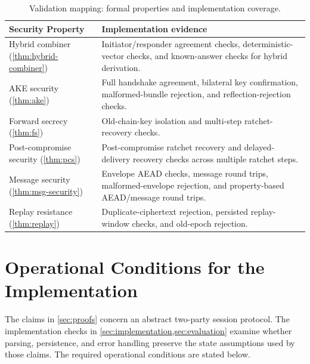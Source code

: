 \documentclass[preprint,12pt]{elsarticle}
\theoremstyle{definition}
\begin{document}
\begin{table}[H]
\centering
\caption{Validation mapping: formal properties and implementation coverage.}\label{tab:test-proof-mapping}
\small
\begin{tabularx}{\textwidth}{@{}L{0.28\textwidth}Y@{}}
\toprule
Security Property & Implementation evidence \\
\midrule
Hybrid combiner (\cref{thm:hybrid-combiner}) & Initiator/responder agreement checks, deterministic-vector checks, and known-answer checks for hybrid derivation. \\
AKE security (\cref{thm:ake}) & Full handshake agreement, bilateral key confirmation, malformed-bundle rejection, and reflection-rejection checks. \\
Forward secrecy (\cref{thm:fs}) & Old-chain-key isolation and multi-step ratchet-recovery checks. \\
Post-compromise security (\cref{thm:pcs}) & Post-compromise ratchet recovery and delayed-delivery recovery checks across multiple ratchet steps. \\
Message security (\cref{thm:msg-security}) & Envelope AEAD checks, message round trips, malformed-envelope rejection, and property-based AEAD/message round trips. \\
Replay resistance (\cref{thm:replay}) & Duplicate-ciphertext rejection, persisted replay-window checks, and old-epoch rejection. \\
\bottomrule
\end{tabularx}
\end{table}


\section{Operational Conditions for the Implementation}\label{sec:operational-invariants}

The claims in \cref{sec:proofs} concern an abstract two-party session protocol.
The implementation checks in \cref{sec:implementation,sec:evaluation} examine
whether parsing, persistence, and error handling preserve the state assumptions
used by those claims. The required operational conditions are stated below.
\end{document}
